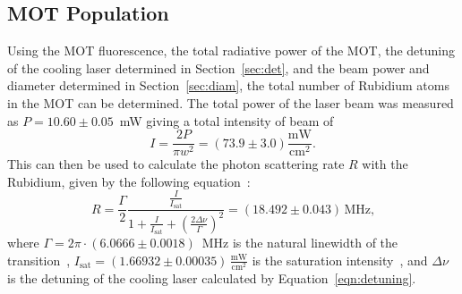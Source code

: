 \documentclass[twocolumn]{article}
\begin{document}
\subsection{MOT Population}
Using the MOT fluorescence, the total radiative power of the MOT, the detuning of the cooling laser determined in Section~\ref{sec:det}, and the beam power and diameter determined in Section~\ref{sec:diam}, the total number of Rubidium atoms in the MOT can be determined. The total power of the laser beam was measured as $P = 10.60 \pm 0.05$~mW giving a total intensity of beam of
\begin{equation}
I = \frac{2 P}{\pi w^2} = (73.9 \pm 3.0) \frac{\text{mW}}{\text{cm}^2}. \nonumber
\end{equation}
This can then be used to calculate the photon scattering rate $R$ with the Rubidium, given by the following equation~\cite{Wieman}:
\begin{equation}
R = \frac{\Gamma}{2} \frac{\frac{I}{I_{\text{sat}}}}{1 + \frac{I}{I_{\text{sat}}} + \left( \frac{2 \Delta \nu}{\Gamma} \right)^2} = (18.492 \pm 0.043)\, \text{MHz,} \nonumber
\end{equation}
where $\Gamma = 2 \pi \cdot (6.0666 \pm 0.0018)$~MHz is the natural linewidth of the transition~\cite{steck}, $I_{\text{sat}} = (1.66932 \pm 0.00035)\, \frac{\text{mW}}{\text{cm}^2}$ is the saturation intensity~\cite{steck}, and $\Delta \nu$ is the detuning of the cooling laser calculated by Equation~\ref{eqn:detuning}. \\
\end{document}
